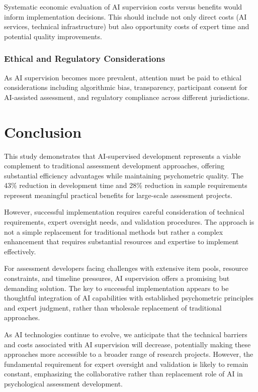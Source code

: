 \documentclass[12pt,a4paper]{article}
\begin{document}
Systematic economic evaluation of AI supervision costs versus benefits would inform implementation decisions. This should include not only direct costs (AI services, technical infrastructure) but also opportunity costs of expert time and potential quality improvements.

\subsubsection{Ethical and Regulatory Considerations}

As AI supervision becomes more prevalent, attention must be paid to ethical considerations including algorithmic bias, transparency, participant consent for AI-assisted assessment, and regulatory compliance across different jurisdictions.

\section{Conclusion}

This study demonstrates that AI-supervised development represents a viable complement to traditional assessment development approaches, offering substantial efficiency advantages while maintaining psychometric quality. The 43\% reduction in development time and 28\% reduction in sample requirements represent meaningful practical benefits for large-scale assessment projects.

However, successful implementation requires careful consideration of technical requirements, expert oversight needs, and validation procedures. The approach is not a simple replacement for traditional methods but rather a complex enhancement that requires substantial resources and expertise to implement effectively.

For assessment developers facing challenges with extensive item pools, resource constraints, and timeline pressures, AI supervision offers a promising but demanding solution. The key to successful implementation appears to be thoughtful integration of AI capabilities with established psychometric principles and expert judgment, rather than wholesale replacement of traditional approaches.

As AI technologies continue to evolve, we anticipate that the technical barriers and costs associated with AI supervision will decrease, potentially making these approaches more accessible to a broader range of research projects. However, the fundamental requirement for expert oversight and validation is likely to remain constant, emphasizing the collaborative rather than replacement role of AI in psychological assessment development.
\end{document}

